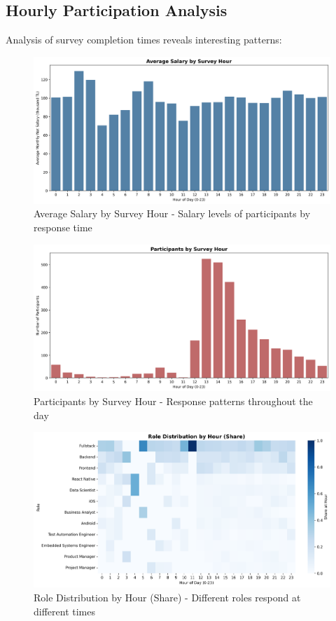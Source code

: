 \documentclass[12pt,a4paper]{article}
\begin{document}
\subsection{Hourly Participation Analysis}
Analysis of survey completion times reveals interesting patterns:

\begin{figure}[H]
    \centering
    \includegraphics[width=\textwidth]{figures/barplot_hourly_avg_salary.png}
    \caption{Average Salary by Survey Hour - Salary levels of participants by response time}
\end{figure}

\begin{figure}[H]
    \centering
    \includegraphics[width=\textwidth]{figures/barplot_hourly_participants.png}
    \caption{Participants by Survey Hour - Response patterns throughout the day}
\end{figure}

\begin{figure}[H]
    \centering
    \includegraphics[width=\textwidth]{figures/heatmap_roles_by_hour.png}
    \caption{Role Distribution by Hour (Share) - Different roles respond at different times}
\end{figure}
\end{document}
